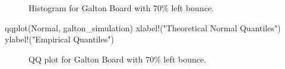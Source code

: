 \documentclass[
  letterpaper,
  DIV=11,
  numbers=noendperiod]{scrartcl}
\newenvironment{Shaded}{\begin{snugshade}}{\end{snugshade}}
\newcommand{\FunctionTok}[1]{\textcolor[rgb]{0.28,0.35,0.67}{#1}}
\newcommand{\NormalTok}[1]{\textcolor[rgb]{0.00,0.23,0.31}{#1}}
\newcommand{\StringTok}[1]{\textcolor[rgb]{0.13,0.47,0.30}{#1}}
\begin{document}
\begin{figure}[H]


\caption{\label{fig-galton-hist-skewed}Histogram for Galton Board with
70\% left bounce.}

\end{figure}%

\begin{Shaded}
\begin{Highlighting}[]
\FunctionTok{qqplot}\NormalTok{(Normal, galton\_simulation)}
\FunctionTok{xlabel!}\NormalTok{(}\StringTok{"Theoretical Normal Quantiles"}\NormalTok{)}
\FunctionTok{ylabel!}\NormalTok{(}\StringTok{"Empirical Quantiles"}\NormalTok{)}
\end{Highlighting}
\end{Shaded}

\begin{figure}[H]


\caption{\label{fig-galton-qq-3}QQ plot for Galton Board with 70\% left
bounce.}

\end{figure}%
\end{document}
